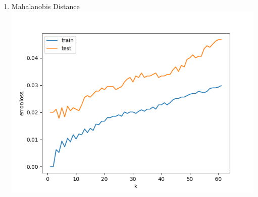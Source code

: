 \documentclass[12pt]{article}
\begin{document}
\begin{enumerate}[noitemsep,topsep=0pt]
\begin{enumerate}
    \item Mahalanobis Distance
    \\ \includegraphics[height=0.4\textheight]{digits_euc}
\end{enumerate}


\end{enumerate}
\end{document}

